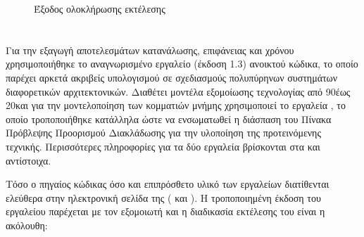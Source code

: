 \begin{figure}[h]
    \centering
    \caption{Έξοδος ολοκλήρωσης εκτέλεσης \gem}
    \label{fig:chap7_gem5_output}
\end{figure}


\section{\mcpat}
\label{chap7_mcpat}

Για την εξαγωγή αποτελεσμάτων κατανάλωσης, επιφάνειας και χρόνου χρησιμοποιήθηκε το αναγνωρισμένο εργαλείο \mcpat (έκδοση 1.3) ανοικτού κώδικα, το οποίο παρέχει αρκετά ακριβείς υπολογισμού σε σχεδιασμούς πολυπύρηνων συστημάτων διαφορετικών αρχιτεκτονικών. Διαθέτει μοντέλα εξομοίωσης τεχνολογίας από 90\nm έως 20\nm και για την μοντελοποίηση των κομματιών μνήμης χρησιμοποιεί το εργαλεία \cacti, το οποίο τροποποιήθηκε κατάλληλα ώστε να ενσωματωθεί η διάσπαση του Πίνακα Πρόβλεψης Προορισμού Διακλάδωσης για την υλοποίηση της προτεινόμενης τεχνικής. Περισσότερες πληροφορίες για τα δύο εργαλεία βρίσκονται στα \cite{li2009mcpat} και \cite{li2009mcpat} αντίστοιχα.
\par
Τόσο ο πηγαίος κώδικας όσο και επιπρόσθετο υλικό των εργαλείων διατίθενται ελεύθερα στην ηλεκτρονική σελίδα της  ( και ). Η τροποποιημένη έκδοση του εργαλείου παρέχεται με τον εξομοιωτή \gem και η διαδικασία εκτέλεσης του είναι η ακόλουθη:

